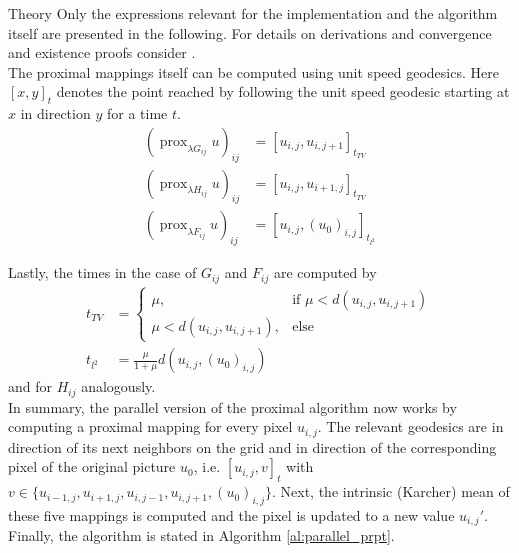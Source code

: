 \begin{chapter}{Theory}
Only the expressions relevant for the implementation and the algorithm itself are presented in the following. For details on derivations and convergence and existence proofs consider \cite{Weinmann}.\\

The proximal mappings itself can be computed using unit speed geodesics. Here $[x,y]_t$ denotes the point reached by
following the unit speed geodesic starting at $x$ in direction $y$ for a time $t$.
\begin{align}
    (\operatorname{prox}_{\lambda G_{ij}}u)_{ij}&=[u_{i,j},u_{i,j+1}]_{t_{TV}} \\
    (\operatorname{prox}_{\lambda H_{ij}}u)_{ij}&=[u_{i,j},u_{i+1,j}]_{t_{TV}} \\
    (\operatorname{prox}_{\lambda F_{ij}}u)_{ij}&=[u_{i,j},(u_0)_{i,j}]_{t_{l^2}}
\end{align}

Lastly, the times in the case of $G_{ij}$ and $F_{ij}$ are computed by
\begin{align}
    t_{TV}&=
    \begin{cases}
	\mu, &\text{if } \mu<d(u_{i,j},u_{i,j+1})\\
	\mu<d(u_{i,j},u_{i,j+1}), & \text{else}
    \end{cases}\\
    t_{l^{2}}&=\frac{\mu}{1+\mu}d(u_{i,j},(u_0)_{i,j})
\end{align}
and for $H_{ij}$ analogously.\\

In summary, the parallel version of the proximal algorithm now works by computing a proximal mapping for every pixel $u_{i,j}$.
The relevant geodesics are in direction of its next neighbors on the grid and in direction of the corresponding pixel of the original picture $u_0$, i.e. $[u_{i,j}, v]_t$ with $v\in\lbrace u_{i-1,j},u_{i+1,j},u_{i,j-1}, u_{i,j+1}, (u_0)_{i,j}\rbrace$. Next, the intrinsic (Karcher) mean \cite{Karcher} of 
these five mappings is computed and the pixel is updated to a new value $u_{i,j}'$.\\

Finally, the algorithm is stated in Algorithm \ref{al:parallel_prpt}.


\end{chapter}
